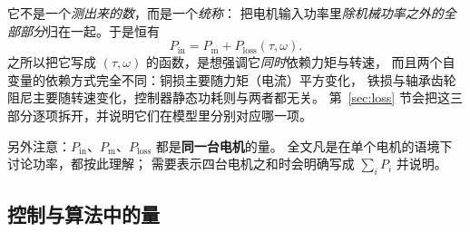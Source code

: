 \documentclass[cn,blue,11pt,device=normal]{elegantnote}
\newcommand{\Pin}{P_{\mathrm{in}}{}}
\newcommand{\Pmech}{P_{\mathrm{m}}{}}
\begin{document}
\begin{note}
它不是一个\emph{测出来的数}，而是一个\emph{统称}：
把电机输入功率里\emph{除机械功率之外的全部部分}归在一起。于是恒有
\begin{equation}\label{eq:plossdef}
  \Pin = \Pmech + P_{\mathrm{loss}}(\tau,\omega).
\end{equation}
之所以把它写成 $(\tau,\omega)$ 的函数，是想强调它\emph{同时}依赖力矩与转速，
而且两个自变量的依赖方式完全不同：铜损主要随力矩（电流）平方变化，
铁损与轴承齿轮阻尼主要随转速变化，控制器静态功耗则与两者都无关。
第~\ref{sec:loss} 节会把这三部分逐项拆开，并说明它们在模型里分别对应哪一项。

另外注意：$\Pin$、$\Pmech$、$P_{\mathrm{loss}}$ 都是\textbf{同一台电机}的量。
全文凡是在单个电机的语境下讨论功率，都按此理解；
需要表示四台电机之和时会明确写成 $\sum_i P_i$ 并说明。
\end{note}

\subsection{控制与算法中的量}
\end{document}
